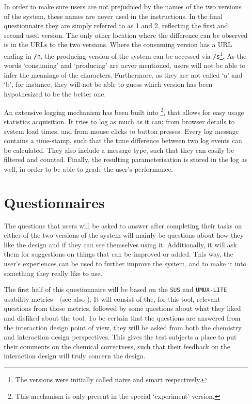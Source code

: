 In order to make sure users are not prejudiced by the names of the two versions of the system, these names are never used in the instructions. In the final questionnaire they are simply referred to as 1 and 2, reflecting the first and second used version. The only other location where the difference can be observed is in the URLs to the two versions. Where the consuming version has a URL ending in \verb|/n|, the producing version of the system can be accessed via \verb|/s|\footnote{The versions were initially called naive and smart respectively.}. As the words `consuming' and `producing' are never mentioned, users will not be able to infer the meanings of the characters. Furthermore, as they are not called `a' and `b', for instance, they will not be able to guess which version has been hypothesized to be the better one.

An extensive logging mechanism has been built into \oframp\footnote{This mechanism is only present in the special `experiment' version.}, that allows for easy usage statistics acquisition. It tries to log as much as it can; from browser details to system load times, and from mouse clicks to button presses. Every log message contains a time-stamp, such that the time difference between two log events can be calculated. They also include a message type, such that they can easily be filtered and counted. Finally, the resulting parameterisation is stored in the log as well, in order to be able to grade the user's performance.



\section{Questionnaires}
The questions that users will be asked to answer after completing their tasks on either of the two versions of the system will mainly be questions about how they like the design and if they can see themselves using it. Additionally, it will ask them for suggestions on things that can be improved or added. This way, the user's experiences can be used to further improve the system, and to make it into something they really like to use.

The first half of this questionnaire will be based on the \verb|SUS| and \verb|UMUX-LITE| usability metrics~\cite{lewis2013umux}~(see also ). It will consist of the, for this tool, relevant questions from those metrics, followed by some questions about what they liked and disliked about the tool. To be certain that the questions are answered from the interaction design point of view, they will be asked from both the chemistry and interaction design perspectives. This gives the test subjects a place to put their comments on the chemical correctness, such that their feedback on the interaction design will truly concern the design.

